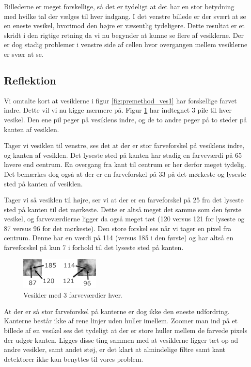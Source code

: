 Billederne er meget forskellige, så det er tydeligt at det har en stor betydning med hvilke tal der vælges til hver indgang. I det venstre billede er der svært at se en eneste vesikel, hvorimod den højre er væsentlig tydeligere. Dette resultat er et skridt i den rigtige retning da vi nu begynder at kunne se flere af vesiklerne. Der er dog stadig problemer i venstre side af cellen hvor overgangen mellem vesiklerne er svær at se.

\subsection{Reflektion}
Vi omtalte kort at vesiklerne i figur \ref{fig:premethod_ves1} har forskellige farvet indre. Dette vil vi nu kigge nærmere på. Figur \ref{fig:premethod_vescolors} har indtegnet 3 pile til hver vesikel. Den ene pil peger på vesiklens indre, og de to andre peger på to steder på kanten af vesiklen. 

Tager vi vesiklen til venstre, ses det at der er stor farveforskel på vesiklens indre, og kanten af vesiklen. Det lyseste sted på kanten har stadig en farveværdi på 65 lavere end centrum. En overgang fra kant til centrum er her derfor meget tydelig. Det bemærkes dog også at der er en farveforskel på 33 på det mørkeste og lyseste sted på kanten af vesiklen. 

Tager vi så vesiklen til højre, ser vi at der er en farveforskel på 25 fra det lyseste sted på kanten til det mørkeste. Dette er altså meget det samme som den første vesikel, og farveværdierne ligger da også meget tæt (120 versus 121 for lyseste og 87 versus 96 for det mørkeste). Den store forskel ses når vi tager en pixel fra centrum. Denne har en værdi på 114 (versus 185 i den første) og har altså en farveforskel på kun 7 i forhold til det lyseste sted på kanten.

\begin{figure}[H]
	\centering
	\includegraphics[scale=5]{files/premethod/img/ves_colors.png}
	\caption{Vesikler med 3 farveværdier hver.\label{fig:premethod_vescolors}}
\end{figure}

At der er så stor farveforskel på kanterne er dog ikke den eneste udfordring. Kanterne består ikke af rene linjer uden huller imellem. Zoomer man ind på et billede af en vesikel ses det tydeligt at der er store huller mellem de farvede pixels der udgør kanten. Ligges disse ting sammen med at vesiklerne ligger tæt op ad andre vesikler, samt andet støj, er det klart at almindelige filtre samt kant detektorer ikke kan benyttes til vores problem. 

